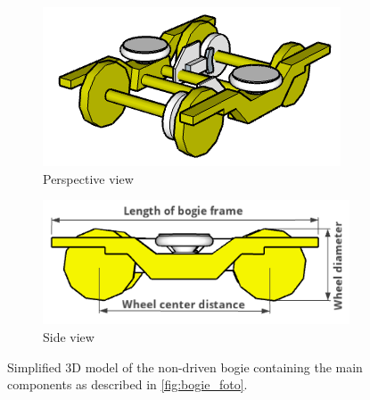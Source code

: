 \begin{figure}[H]
	\centering
	\begin{subfigure}[b]{0.48\textwidth}
		\centering
		\includegraphics{fig/running_bogie_sketchup.PNG}
		\caption{Perspective view}
	\end{subfigure}
	\begin{subfigure}[b]{0.48\textwidth}
		\centering
		\includegraphics[width=\linewidth]{fig/running_bogie_sideview_with_labels.PNG}
		\caption{Side view}
		\label{fig:bogie_side_view}
	\end{subfigure}
	\caption{Simplified 3D model of the non-driven bogie containing the main components as described in \cref{fig:bogie_foto}.}
	\label{fig:bogie_model}
\end{figure}

